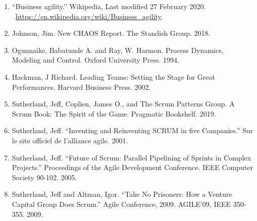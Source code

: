 \documentclass[12pt,a4paper,parskip=full]{scrartcl}
\begin{document}
\begin{enumerate}
\itemsep1pt\parskip0pt
\item
  ``Business agility.'' Wikipedia, Last modified 27 February
  2020.
  \newline ~\href{https://en.wikipedia.org/wiki/Business_agility}{https://en.wikipedia.org/wiki/Business\_agility}.
\item
  Johnson, Jim. New CHAOS Report. The Standish Group. 2018.
\item
  Ogunnaike, Babatunde A. and Ray, W. Harmon. Process Dynamics, Modeling
  and Control. Oxford University Press. 1994.
\item
  Hackman, J Richard. Leading Teams: Setting the Stage for Great
  Performances. Harvard Business Press. 2002.
\item
  Sutherland, Jeff, Coplien, James O., and The Scrum Patterns Group. A
  Scrum Book: The Spirit of the Game. Pragmatic Bookshelf. 2019.
\item
  Sutherland, Jeff. ``Inventing and Reinventing SCRUM in five
  Companies.'' Sur le site officiel de l'alliance agile. 2001.
\item
  Sutherland, Jeff. ``Future of Scrum: Parallel Pipelining of Sprints in
  Complex Projects.'' Proceedings of the Agile Development Conference.
  IEEE Computer Society 90-102. 2005.
\item
  Sutherland, Jeff and Altman, Igor. ``Take No Prisoners: How a Venture
  Capital Group Does Scrum.'' Agile Conference, 2009. AGILE'09, IEEE
  350-355. 2009.
\end{enumerate}
\end{document}
